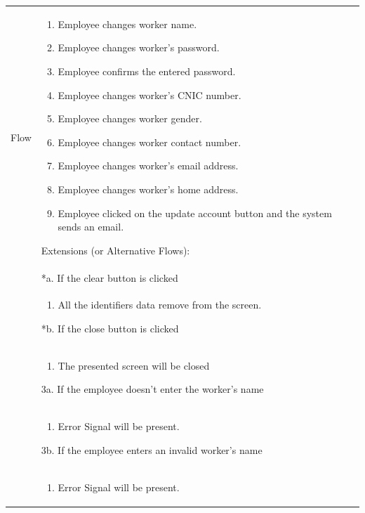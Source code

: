\documentclass[12pt,a4paper]{report}
\begin{document}
\begin{tabular}{ | m{3cm} | m{12cm}| } \hline
Flow &
\begin{enumerate}
\item  Employee changes worker name.
\item  Employee changes worker's password.
\item  Employee confirms the entered password.
\item  Employee changes worker's CNIC number.
\item Employee changes worker gender. 
\item Employee changes worker contact number. 
\item Employee changes worker's email address.
\item Employee changes worker's home address. 
 \item Employee clicked on the update account button and the system sends an email.
\end{enumerate}

Extensions (or Alternative Flows):\\
& *a. If the clear button is clicked \\
& \begin{enumerate}
		\item All the identifiers data remove from the screen.
	\end{enumerate}
*b. If the close button is clicked\\
&	\begin{enumerate}
		\item The presented screen will be closed
	\end{enumerate}
3a. If the employee doesn't enter the worker's name \\ 	
&	\begin{enumerate}
		\item Error Signal will be present.
	\end{enumerate}
3b. If the employee enters an invalid worker's name \\ 	
&	\begin{enumerate}
		\item Error Signal will be present.
	\end{enumerate}
\\\hline
\end{tabular}
\end{document}
